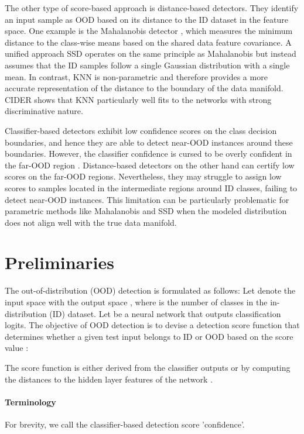 \documentclass[10pt,twocolumn,letterpaper]{article}
\begin{document}
The other type of score-based approach is distance-based detectors. They identify an input sample as OOD based on its distance to the ID dataset in the feature space. One example is the Mahalanobis detector \cite{lee2018simple}, which measures the minimum distance to the class-wise means based on the shared data feature covariance.
A unified approach SSD \cite{sehwag2021ssd} operates on the same principle as Mahalanobis but instead assumes that the ID samples follow a single Gaussian distribution with a single mean. 
In contrast, KNN \cite{sun2022out} is non-parametric and therefore provides a more accurate representation of the distance to the boundary of the data manifold. CIDER \cite{ming2022exploit} shows that KNN particularly well fits to the networks with strong discriminative nature.


Classifier-based detectors exhibit low confidence scores on the class decision boundaries, and hence they are able to detect near-OOD instances around these boundaries.
However, the classifier confidence is cursed to be overly confident in the far-OOD region \cite{hein2019relu}.
Distance-based detectors on the other hand can certify low scores on the far-OOD regions.
Nevertheless, they may struggle to assign low scores to samples located in the intermediate regions around ID classes, failing to detect near-OOD instances. This limitation can be particularly problematic for parametric methods like Mahalanobis and SSD when the modeled distribution does not align well with the true data manifold.



\section{Preliminaries}
The out-of-distribution (OOD) detection is formulated as follows: Let  denote the input space with the output space , where  is the number of classes in the in-distribution (ID) dataset. Let  be a neural network that outputs classification logits. 
The objective of OOD detection is to devise a detection score function  that determines whether a given test input  belongs to ID or OOD based on the score value :

The score function  is either derived from the classifier outputs  or by computing the distances to the hidden layer features  of the network .





\paragraph{Terminology}
For brevity, we call the classifier-based detection score 'confidence'.
\end{document}
